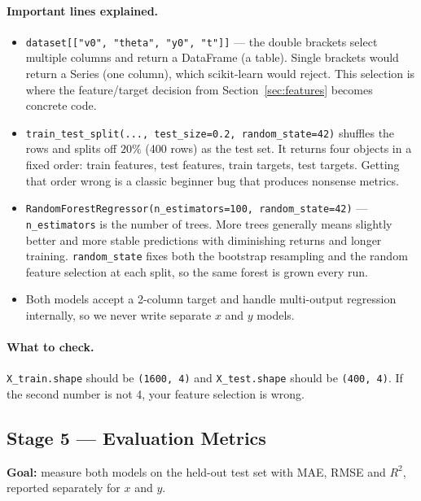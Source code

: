 \documentclass[11pt,a4paper]{article}
\newcommand{\Rsq}{R^{2}}
\begin{document}
\paragraph{Important lines explained.}
\begin{itemize}[leftmargin=2em,itemsep=0.2em]
  \item \texttt{dataset[["v0", "theta", "y0", "t"]]} --- the double brackets select multiple columns
        and return a DataFrame (a table). Single brackets would return a Series (one column), which
        scikit-learn would reject. This selection is where the feature/target decision from
        Section~\ref{sec:features} becomes concrete code.
  \item \texttt{train\_test\_split(..., test\_size=0.2, random\_state=42)} shuffles the rows and
        splits off $20\%$ (400 rows) as the test set. It returns four objects in a fixed order:
        train features, test features, train targets, test targets. Getting that order wrong is a
        classic beginner bug that produces nonsense metrics.
  \item \texttt{RandomForestRegressor(n\_estimators=100, random\_state=42)} ---
        \texttt{n\_estimators} is the number of trees. More trees generally means slightly better
        and more stable predictions with diminishing returns and longer training.
        \texttt{random\_state} fixes both the bootstrap resampling and the random feature selection
        at each split, so the same forest is grown every run.
  \item Both models accept a 2-column target and handle multi-output regression internally, so we
        never write separate $x$ and $y$ models.
\end{itemize}

\paragraph{What to check.}
\texttt{X\_train.shape} should be \texttt{(1600, 4)} and \texttt{X\_test.shape} should be
\texttt{(400, 4)}. If the second number is not 4, your feature selection is wrong.

\subsection*{Stage 5 --- Evaluation Metrics}

\textbf{Goal:} measure both models on the held-out test set with MAE, RMSE and $\Rsq$, reported
separately for $x$ and $y$.
\end{document}
